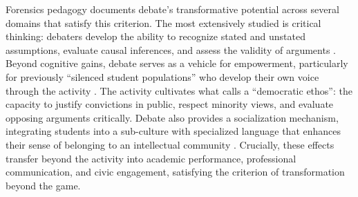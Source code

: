 \documentclass[12pt]{article}
\begin{document}
Forensics pedagogy documents debate's transformative potential across several domains that satisfy this criterion. The most extensively studied is critical thinking: debaters develop the ability to recognize stated and unstated assumptions, evaluate causal inferences, and assess the validity of arguments \parencite{colbert1995enhancing, hill1993value}. Beyond cognitive gains, debate serves as a vehicle for empowerment, particularly for previously ``silenced student populations'' who develop their own voice through the activity \parencite{snider2003gamemaster}. The activity cultivates what \textcite{hicks1998public} calls a ``democratic ethos'': the capacity to justify convictions in public, respect minority views, and evaluate opposing arguments critically. Debate also provides a socialization mechanism, integrating students into a sub-culture with specialized language that enhances their sense of belonging to an intellectual community \parencite{cirlin1997sociological, kargacin1998state}. Crucially, these effects transfer beyond the activity into academic performance, professional communication, and civic engagement, satisfying the criterion of transformation beyond the game.
\end{document}
